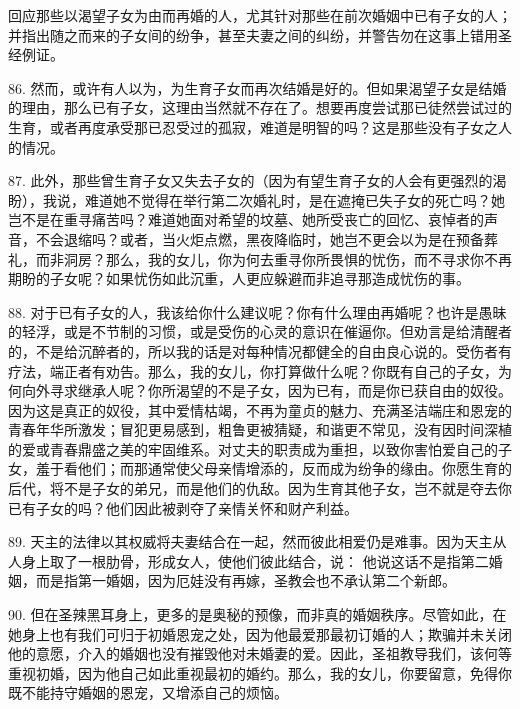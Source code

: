 回应那些以渴望子女为由而再婚的人，尤其针对那些在前次婚姻中已有子女的人；并指出随之而来的子女间的纷争，甚至夫妻之间的纠纷，并警告勿在这事上错用圣经例证。\par

86. 然而，或许有人以为，为生育子女而再次结婚是好的。但如果渴望子女是结婚的理由，那么已有子女，这理由当然就不存在了。想要再度尝试那已徒然尝试过的生育，或者再度承受那已忍受过的孤寂，难道是明智的吗？这是那些没有子女之人的情况。\par

87. 此外，那些曾生育子女又失去子女的（因为有望生育子女的人会有更强烈的渴盼），我说，难道她不觉得在举行第二次婚礼时，是在遮掩已失子女的死亡吗？她岂不是在重寻痛苦吗？难道她面对希望的坟墓、她所受丧亡的回忆、哀悼者的声音，不会退缩吗？或者，当火炬点燃，黑夜降临时，她岂不更会以为是在预备葬礼，而非洞房？那么，我的女儿，你为何去重寻你所畏惧的忧伤，而不寻求你不再期盼的子女呢？如果忧伤如此沉重，人更应躲避而非追寻那造成忧伤的事。\par

88. 对于已有子女的人，我该给你什么建议呢？你有什么理由再婚呢？也许是愚昧的轻浮，或是不节制的习惯，或是受伤的心灵的意识在催逼你。但劝言是给清醒者的，不是给沉醉者的，所以我的话是对每种情况都健全的自由良心说的。受伤者有疗法，端正者有劝告。那么，我的女儿，你打算做什么呢？你既有自己的子女，为何向外寻求继承人呢？你所渴望的不是子女，因为已有，而是你已获自由的奴役。因为这是真正的奴役，其中爱情枯竭，不再为童贞的魅力、充满圣洁端庄和恩宠的青春年华所激发；冒犯更易感到，粗鲁更被猜疑，和谐更不常见，没有因时间深植的爱或青春鼎盛之美的牢固维系。对丈夫的职责成为重担，以致你害怕爱自己的子女，羞于看他们；而那通常使父母亲情增添的，反而成为纷争的缘由。你愿生育的后代，将不是子女的弟兄，而是他们的仇敌。因为生育其他子女，岂不就是夺去你已有子女的吗？他们因此被剥夺了亲情关怀和财产利益。\par

89. 天主的法律以其权威将夫妻结合在一起，然而彼此相爱仍是难事。因为天主从人身上取了一根肋骨，形成女人，使他们彼此结合，说： 他说这话不是指第二婚姻，而是指第一婚姻，因为厄娃没有再嫁，圣教会也不承认第二个新郎。\par

90. 但在圣辣黑耳身上，更多的是奥秘的预像，而非真的婚姻秩序。尽管如此，在她身上也有我们可归于初婚恩宠之处，因为他最爱那最初订婚的人；欺骗并未关闭他的意愿，介入的婚姻也没有摧毁他对未婚妻的爱。因此，圣祖教导我们，该何等重视初婚，因为他自己如此重视最初的婚约。那么，我的女儿，你要留意，免得你既不能持守婚姻的恩宠，又增添自己的烦恼。\par

